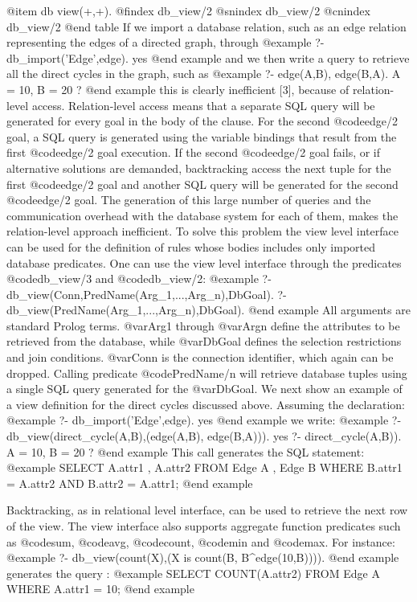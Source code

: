 @item db view(+,+).
@findex db_view/2
@snindex db_view/2
@cnindex db_view/2
@end table
If we import a database relation, such as an edge relation representing the edges of a directed graph, through
@example
?- db_import('Edge',edge). 
yes
@end example
and we then write a query to retrieve all the direct cycles in the
graph, such as
@example
?- edge(A,B), edge(B,A). 
A = 10, 
B = 20 ?
@end example
this is clearly inefficient [3], because of relation-level
access. Relation-level access means that a separate SQL query will be
generated for every goal in the body of the clause. For the second
@code{edge/2} goal, a SQL query is generated using the variable bindings that
result from the first @code{edge/2} goal execution. If the second
@code{edge/2} goal
fails, or if alternative solutions are demanded, backtracking access the
next tuple for the first @code{edge/2} goal and another SQL query will be
generated for the second @code{edge/2} goal. The generation of this large
number of queries and the communication overhead with the database
system for each of them, makes the relation-level approach inefficient.
To solve this problem the view level interface can be used for the
definition of rules whose bodies includes only imported database
predicates.  One can use the view level interface through the predicates
@code{db_view/3} and @code{db_view/2}:
@example
?- db_view(Conn,PredName(Arg_1,...,Arg_n),DbGoal).  
?- db_view(PredName(Arg_1,...,Arg_n),DbGoal).
@end example
 All arguments are standard Prolog terms. @var{Arg1} through @var{Argn}
define the attributes to be retrieved from the database, while
@var{DbGoal} defines the selection restrictions and join
conditions. @var{Conn} is the connection identifier, which again can be
dropped. Calling predicate @code{PredName/n} will retrieve database
tuples using a single SQL query generated for the @var{DbGoal}.  We next show
an example of a view definition for the direct cycles discussed
above. Assuming the declaration: 
@example
?- db_import('Edge',edge). 
yes
@end example
we
write:
@example
?- db_view(direct_cycle(A,B),(edge(A,B), edge(B,A))). 
yes 
?- direct_cycle(A,B)). 
A = 10, 
B = 20 ?  
@end example
This call generates the SQL
statement:
@example
SELECT A.attr1 , A.attr2
FROM Edge A , Edge B 
WHERE B.attr1 = A.attr2 AND B.attr2 = A.attr1;
@end example

Backtracking, as in relational level interface, can be used to retrieve the next row of the view.
The view interface also supports aggregate function predicates such as
@code{sum}, @code{avg}, @code{count}, @code{min} and @code{max}. For
instance:
@example
?- db_view(count(X),(X is count(B, B^edge(10,B)))).
@end example
generates the query :
@example
SELECT COUNT(A.attr2) 
FROM Edge A WHERE A.attr1 = 10;
@end example


